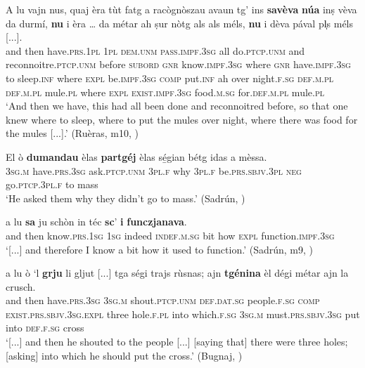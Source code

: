 \ea
\label{ex:indinterr5}
\gll A lu vajn nus, quaj èra tùt fatg a racògnòszau avaun tg’ ins \textbf{savèva} \textbf{núa} inṣ vèva da durmí, \textbf{nu} i èra … da métar ah ṣur nòtg als als méls, \textbf{nu} i dèva pával pl̩s méls [...]. \\
and then have.\textsc{prs.1pl} \textsc{1pl} \textsc{dem.unm} \textsc{pass.impf.3sg} all do.\textsc{ptcp.unm} and  reconnoitre.\textsc{ptcp.unm} before \textsc{subord} \textsc{gnr}  know.\textsc{impf.3sg} where \textsc{gnr} have.\textsc{impf.3sg} to sleep.\textsc{inf} where \textsc{expl} be.\textsc{impf.3sg} {} \textsc{comp} put.\textsc{inf} ah over night.\textsc{f.sg} \textsc{def.m.pl} \textsc{def.m.pl} mule.\textsc{pl} where \textsc{expl} \textsc{exist.impf.3sg} food.\textsc{m.sg} for.\textsc{def.m.pl} mule.\textsc{pl}\\
\glt `And then we have, this had all been done and reconnoitred before, so that one knew where to sleep, where to put the mules over night, where there was food for the mules [...].' (Ruèras, m10, )
\z

\ea\label{ex:indinterr6}
\gll    El ò \textbf{dumandau} èlas \textbf{partgéj} èlas sé̱gian bétg idas a mèssa.\\
\textsc{3sg.m} have.\textsc{prs.3sg} ask.\textsc{ptcp.unm} \textsc{3pl.f} why  \textsc{3pl.f} be.\textsc{prs.sbjv.3pl} \textsc{neg} go.\textsc{ptcp.3pl.f} to mass\\
\glt `He asked them why they didn’t go to mass.' (Sadrún, \citealt[103]{Büchli1966})
\z

\ea
\label{ex:indinterr7}
\gll [...] a lu \textbf{sa} ju schòn in téc \textbf{sc}’ \textbf{i} \textbf{funczjanava}.   \\
{} and then know.\textsc{prs.1sg} \textsc{1sg} indeed \textsc{indef.m.sg} bit how \textsc{expl} function.\textsc{impf.3sg}\\
\glt `[...] and therefore I know a bit how it used to function.' (Sadrún, m9, )
\z

\ea
\label{ex:indinterr8}
\gll [...] a lu ò `l \textbf{grju} li gljut [...] tga ségi trajs rùsnas; ajn \textbf{tgénina} èl dégi métar ajn la crusch.\\
{} and then have.\textsc{prs.3sg} \textsc{3sg.m} shout.\textsc{ptcp.unm} \textsc{def.dat.sg} people.\textsc{f.sg} {} \textsc{comp} \textsc{exist.prs.sbjv.3sg.expl} three hole.\textsc{f.pl} into which.\textsc{f.sg} \textsc{3sg.m} must.\textsc{prs.sbjv.3sg} put into \textsc{def.f.sg} cross\\
\glt `[...] and then he shouted to the people [...] [saying that] there were three holes; [asking] into which he should put the cross.' (Bugnaj, \citealt[134]{Büchli1966})
\z

